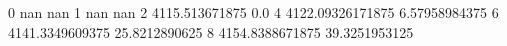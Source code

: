 0 nan nan
1 nan nan
2 4115.513671875 0.0
4 4122.09326171875 6.57958984375
6 4141.3349609375 25.8212890625
8 4154.8388671875 39.3251953125
